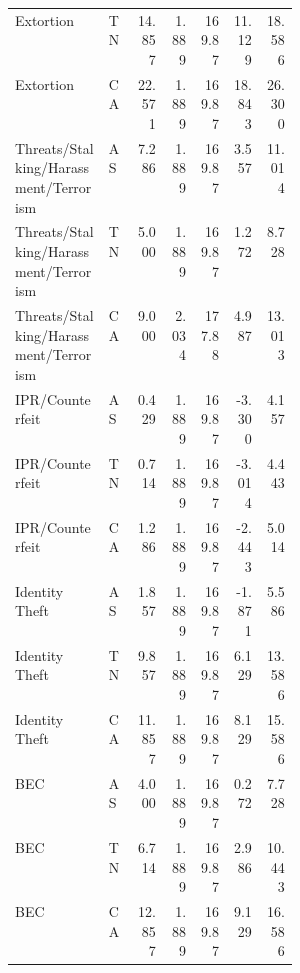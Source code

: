 \documentclass[11pt]{article}
\begin{document}
\begin{longtable}{p{0.33\linewidth}lrrrrr}
Extortion & TN & 14.857 & 1.889 & 169.87 & 11.129 & 18.586 \\
Extortion & CA & 22.571 & 1.889 & 169.87 & 18.843 & 26.300 \\
Threats/Stalking/Harassment/Terrorism & AS & 7.286 & 1.889 & 169.87 & 3.557 & 11.014 \\
Threats/Stalking/Harassment/Terrorism & TN & 5.000 & 1.889 & 169.87 & 1.272 & 8.728 \\
Threats/Stalking/Harassment/Terrorism & CA & 9.000 & 2.034 & 177.88 & 4.987 & 13.013 \\
IPR/Counterfeit & AS & 0.429 & 1.889 & 169.87 & -3.300 & 4.157 \\
IPR/Counterfeit & TN & 0.714 & 1.889 & 169.87 & -3.014 & 4.443 \\
IPR/Counterfeit & CA & 1.286 & 1.889 & 169.87 & -2.443 & 5.014 \\
Identity Theft & AS & 1.857 & 1.889 & 169.87 & -1.871 & 5.586 \\
Identity Theft & TN & 9.857 & 1.889 & 169.87 & 6.129 & 13.586 \\
Identity Theft & CA & 11.857 & 1.889 & 169.87 & 8.129 & 15.586 \\
BEC & AS & 4.000 & 1.889 & 169.87 & 0.272 & 7.728 \\
BEC & TN & 6.714 & 1.889 & 169.87 & 2.986 & 10.443 \\
BEC & CA & 12.857 & 1.889 & 169.87 & 9.129 & 16.586 \\
\bottomrule
\end{longtable}
\end{document}
